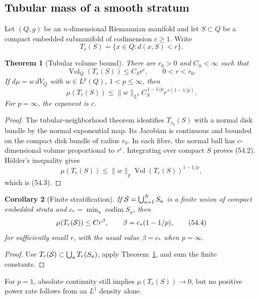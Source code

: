 \documentclass[11pt]{article}
\newtheorem{theorem}{Theorem}[section]
\newtheorem{corollary}[theorem]{Corollary}
\begin{document}
\subsection{Tubular mass of a smooth stratum}

Let \((Q,g)\) be an \(n\)-dimensional Riemannian manifold and let
\(S\subset Q\) be a compact embedded submanifold of codimension
\(c\ge1\).  Write
\[
                         T_r(S)=\{x\in Q:d(x,S)<r\}.            \tag{54.1}
\]

\begin{theorem}[Tubular volume bound]
\label{thm:v11v54-tube}
There are \(r_0>0\) and \(C_S<\infty\) such that
\[
                         \operatorname{Vol}_Q(T_r(S))
                              \le C_S r^c,\qquad 0<r<r_0.      \tag{54.2}
\]
If \(d\mu=w\,dV_Q\) with \(w\in L^p(Q)\), \(1<p\le\infty\), then
\[
 \mu(T_r(S))
 \le \lVert w\rVert_{L^p}C_S^{\,1-1/p}
                         r^{\,c(1-1/p)}.                      \tag{54.3}
\]
For \(p=\infty\), the exponent is \(c\).
\end{theorem}

\begin{proof}
The tubular-neighborhood theorem identifies \(T_{r_0}(S)\) with a
normal disk bundle by the normal exponential map.  Its Jacobian is
continuous and bounded on the compact disk bundle of radius \(r_0\).
In each fibre, the normal ball has \(c\)-dimensional volume proportional
to \(r^c\).  Integrating over compact \(S\) proves (54.2).
Hölder's inequality gives
\[
 \mu(T_r(S))\le\lVert w\rVert_p
              \operatorname{Vol}(T_r(S))^{1-1/p},
\]
which is (54.3).
\end{proof}

\begin{corollary}[Finite stratification]
\label{cor:v11v54-stratified}
If \({\cal S}=\bigcup_{a=1}^N S_a\) is a finite union of compact
embedded strata and \(c_*=\min_a\operatorname{codim}S_a\), then
\[
                     \mu(T_r({\cal S}))\le C r^\beta,\qquad
              \beta=c_*(1-1/p),                              \tag{54.4}
\]
for sufficiently small \(r\), with the usual value
\(\beta=c_*\) when \(p=\infty\).
\end{corollary}

\begin{proof}
Use \(T_r({\cal S})\subset\bigcup_aT_r(S_a)\), apply
Theorem~\ref{thm:v11v54-tube}, and sum the finite constants.
\end{proof}

For \(p=1\), absolute continuity still implies
\(\mu(T_r(S))\to0\), but no positive power rate follows from an
\(L^1\) density alone.
\end{document}
